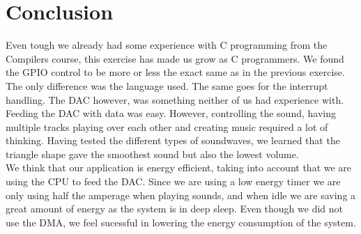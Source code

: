 \section{Conclusion}
Even tough we already had some experience with C programming from the Compilers course, this exercise has made us grow as C programmers. We found the GPIO control to be more or less the exact same as in the previous exercise. The only difference was the language used. The same goes for the interrupt handling. The DAC however, was something neither of us had experience with. Feeding the DAC with data was easy. However, controlling the sound, having multiple tracks playing over each other and creating music required a lot of thinking. Having tested the different types of soundwaves, we learned that the triangle shape gave the smoothest sound but also the lowest volume. \\

We think that our application is energy efficient, taking into account that we are using the CPU to feed the DAC. Since we are using a low energy timer we are only using half the amperage when playing sounds, and when idle we are saving a great amount of energy as the system is in deep sleep. Even though we did not use the DMA, we feel sucessful in lowering the energy consumption of the system.
   
